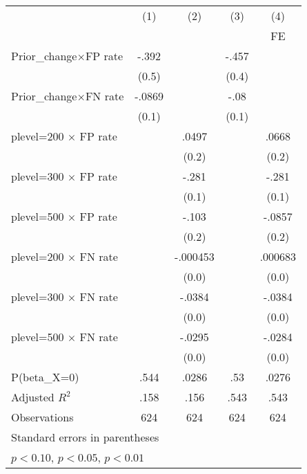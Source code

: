 \begin{tabular}{l*{4}{c}}
\hline\hline
                &\multicolumn{1}{c}{(1)}&\multicolumn{1}{c}{(2)}&\multicolumn{1}{c}{(3)}&\multicolumn{1}{c}{(4)}\\
                &\multicolumn{1}{c}{}&\multicolumn{1}{c}{}&\multicolumn{1}{c}{}&\multicolumn{1}{c}{FE}\\
\hline
Prior\_change$\times$FP rate&    -.392         &                  &    -.457         &                  \\
                &    (0.5)         &                  &    (0.4)         &                  \\
Prior\_change$\times$FN rate&   -.0869         &                  &     -.08         &                  \\
                &    (0.1)         &                  &    (0.1)         &                  \\
plevel=200 $\times$ FP rate&                  &    .0497         &                  &    .0668         \\
                &                  &    (0.2)         &                  &    (0.2)         \\
plevel=300 $\times$ FP rate&                  &    -.281\sym{***}&                  &    -.281\sym{***}\\
                &                  &    (0.1)         &                  &    (0.1)         \\
plevel=500 $\times$ FP rate&                  &    -.103         &                  &   -.0857         \\
                &                  &    (0.2)         &                  &    (0.2)         \\
plevel=200 $\times$ FN rate&                  & -.000453         &                  &  .000683         \\
                &                  &    (0.0)         &                  &    (0.0)         \\
plevel=300 $\times$ FN rate&                  &   -.0384\sym{*}  &                  &   -.0384\sym{*}  \\
                &                  &    (0.0)         &                  &    (0.0)         \\
plevel=500 $\times$ FN rate&                  &   -.0295         &                  &   -.0284         \\
                &                  &    (0.0)         &                  &    (0.0)         \\
\hline
P(beta\_X=0)     &     .544         &    .0286         &      .53         &    .0276         \\
Adjusted \(R^{2}\)&     .158         &     .156         &     .543         &     .543         \\
Observations    &      624         &      624         &      624         &      624         \\
\hline\hline
\multicolumn{5}{l}{\footnotesize Standard errors in parentheses}\\
\multicolumn{5}{l}{\footnotesize \sym{*} \(p<0.10\), \sym{**} \(p<0.05\), \sym{***} \(p<0.01\)}\\
\end{tabular}
